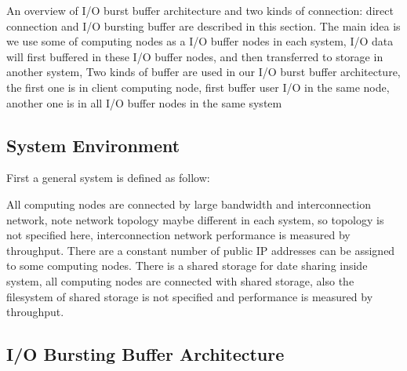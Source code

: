 \documentclass[JIP,draft]{ipsj}
\begin{document}
An overview of I/O burst buffer architecture and two kinds of connection: direct connection and I/O bursting buffer are described in this section.
The main idea is we use some of computing nodes as a I/O buffer nodes in each system, I/O data will first buffered in these I/O buffer nodes, and then transferred to storage in another system, 
Two kinds of buffer are used in our I/O burst buffer architecture, the first one is in client computing node, first buffer user I/O in the same node, another one is in all I/O buffer nodes in the same system




\subsection{System Environment}
First a general system is defined as follow:

All computing nodes are connected by large bandwidth and interconnection network, note network topology maybe different in each system, so topology is not specified here, interconnection network performance is measured by throughput.
There are a constant number of public IP addresses can be assigned to some computing nodes.
There is a shared storage for date sharing inside system, all computing nodes are connected with shared storage, also the filesystem of shared storage is not specified and performance is measured by throughput.


\subsection{I/O Bursting Buffer Architecture}
\end{document}
